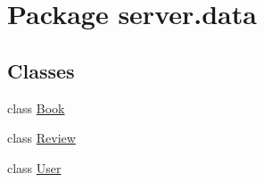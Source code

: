 \hypertarget{namespaceserver_1_1data}{}\section{Package server.\+data}
\label{namespaceserver_1_1data}
\subsection*{Classes}
\begin{DoxyCompactItemize}
\item 
class \hyperlink{classserver_1_1data_1_1_book}{Book}
\item 
class \hyperlink{classserver_1_1data_1_1_review}{Review}
\item 
class \hyperlink{classserver_1_1data_1_1_user}{User}
\end{DoxyCompactItemize}
